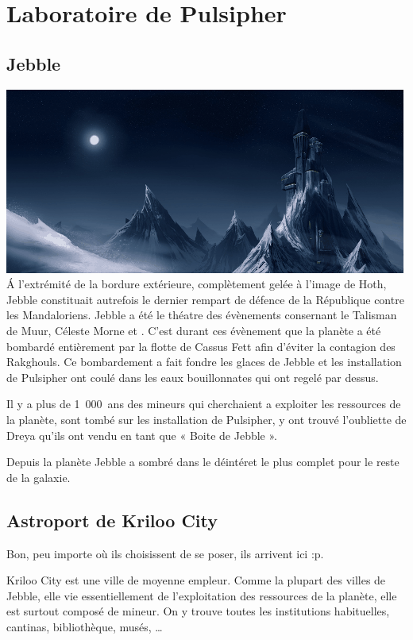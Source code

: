 \section{Laboratoire de Pulsipher}

\subsection{Jebble}\label{sec:jebble}
\noindent\includegraphics[width=\linewidth]{_img/dos-au-muur/jebble.png}
\'A l'extrémité de la bordure extérieure, complètement gelée à l’image de Hoth, Jebble constituait autrefois le dernier rempart de défence de la République contre les Mandaloriens. Jebble a été le théatre des évènements consernant le Talisman de Muur, Céleste Morne et . C’est durant ces évènement que la planète a été bombardé entièrement par la flotte de Cassus Fett afin d’éviter la contagion des Rakghouls. Ce bombardement a fait fondre les glaces de Jebble et les installation de Pulsipher ont coulé dans les eaux bouillonnates qui ont regelé par dessus.

Il y a plus de 1~000~ans des mineurs qui cherchaient a exploiter les ressources de la planète, sont tombé sur les installation de Pulsipher, y ont trouvé l'oubliette de Dreya qu'ils ont vendu en tant que « Boite de Jebble ».

Depuis la planète Jebble a sombré dans le déintéret le plus complet pour le reste de la galaxie.

\subsection{Astroport de Kriloo City}
Bon, peu importe où ils choisissent de se poser, ils arrivent ici :p.

Kriloo City est une ville de moyenne empleur. Comme la plupart des villes de Jebble, elle vie essentiellement de l’exploitation des ressources de la planète, elle est surtout composé de mineur. On y trouve toutes les institutions habituelles, cantinas, bibliothèque, musés, \ldots

